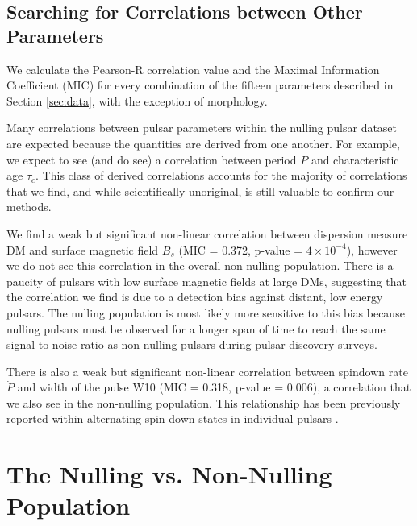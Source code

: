\documentclass[fleqn,usenatbib]{mnras}
\begin{document}
\subsection{Searching for Correlations between Other Parameters}
\label{ssec: other_correlations}

We calculate the Pearson-R correlation value and the Maximal Information Coefficient (MIC) for every combination of the fifteen parameters described in Section \ref{sec:data}, with the exception of morphology. 

Many correlations between pulsar parameters within the nulling pulsar dataset are expected because the quantities are derived from one another. For example, we expect to see (and do see) a correlation between period $P$ and characteristic age $\tau_c$. This class of derived correlations accounts for the majority of correlations that we find, and while scientifically unoriginal, is still valuable to confirm our methods.

We find a weak but significant non-linear correlation between dispersion measure DM and surface magnetic field $B_s$ (MIC = 0.372, p-value = $4\times10^{-4}$), however we do not see this correlation in the overall non-nulling population. There is a paucity of pulsars with low surface magnetic fields at large DMs, suggesting that the correlation we find is due to a detection bias against distant, low energy pulsars. The nulling population is most likely more sensitive to this bias because nulling pulsars must be observed for a longer span of time to reach the same signal-to-noise ratio as non-nulling pulsars during pulsar discovery surveys.

There is also a weak but significant non-linear correlation between spindown rate $\dot{P}$ and width of the pulse W10 (MIC = 0.318, p-value = 0.006), a correlation that we also see in the non-nulling population. This relationship has been previously reported within alternating spin-down states in individual pulsars \citep[e.g., ][]{Lyne2010, Perera2016}.


\section{The Nulling vs. Non-Nulling Population}
\label{sec: nullvsnonnull}
\end{document}
